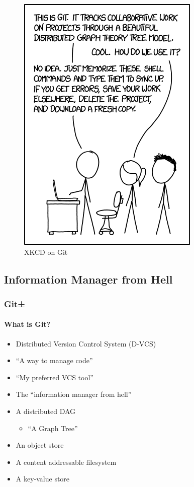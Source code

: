 \documentclass{beamer}
\begin{document}
\begin{frame}
\begin{figure}
\includegraphics[scale=0.45]{xkcd_git.png}
\caption{XKCD on Git\cite{website:xkcd_git_comic}}
\end{figure}
\end{frame}

\subsection{Information Manager from Hell}
\begin{frame}
\frametitle{Git±}
\framesubtitle{What is Git?}
\begin{itemize}
\item<2->{Distributed Version Control System (D-VCS)}
\item<3->{``A way to manage code''}
\item<4->{``My preferred VCS tool''}
\item<5->{The ``information manager from hell''}
\item<6->{A distributed DAG}
\begin{itemize}
\item<6->{``A Graph Tree''}
\end{itemize}
\item<7->{An object store}
\item<8->{A content addressable filesystem}
\item<9->{A key-value store}
\end{itemize}
\end{frame}
\end{document}
